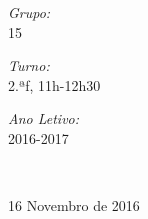 \documentclass[12pt,a4paper,oneside]{article}
\begin{document}
\begin{titlepage}
\begin{center}
\noindent
\begin{minipage}{0.3\textwidth}
\begin{flushleft} \large
\emph{Grupo:} \\ 
15
\end{flushleft}
\end{minipage}
\begin{minipage}{0.3\textwidth}
\begin{center} \large
\emph{Turno:} \\ 
2.ªf, 11h-12h30
\end{center}
\end{minipage}
\begin{minipage}{0.3\textwidth}
\begin{flushright} \large
\emph{Ano Letivo:} \\
2016-2017
\end{flushright}
\end{minipage}
\\[0.5cm]
\vfill

{\large 16 Novembro de 2016}

\end{center}
\end{titlepage}



\end{document}
